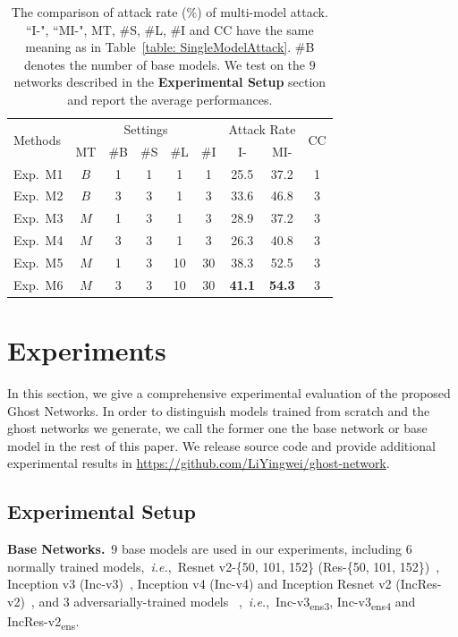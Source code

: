 \documentclass[letterpaper]{article} %
\def\ie{\emph{i.e.}}
\begin{document}
\begin{table}[tb]
\vspace{1ex}
\centering
\small
\begin{tabular}{|l|ccccc|cc|c|}
\hline
\multirow{2}{*}{Methods} & \multicolumn{5}{c|}{Settings} & \multicolumn{2}{c|}{Attack Rate} & \multirow{2}{*}{CC}  \\
\cline{2-8}
   & MT & \#B & \#S & \#L & \#I & I- & MI- &\\ 
\hline
\hline
Exp.~M1 & $B$ & 1 & 1 & 1 & 1  & 25.5 & 37.2 & 1 \\ 
Exp.~M2 & $B$ & 3 & 3 & 1 & 3  & 33.6 & 46.8 & 3 \\ 
Exp.~M3 & $M$ & 1 & 3 & 1 & 3  & 28.9 & 37.2 & 3 \\ 
Exp.~M4 & $M$ & 3 & 3 & 1 & 3  & 26.3 & 40.8 & 3 \\ 
Exp.~M5 & $M$ & 1 & 3 & 10& 30 & 38.3 & 52.5 & 3 \\ 
Exp.~M6 & $M$ & 3 & 3 & 10& 30 & \textbf{41.1} & \textbf{54.3} & 3 \\ 
\hline
\end{tabular}
\caption{The comparison of attack rate ($\%$) of multi-model attack. ``I-", ``MI-", MT, \#S, \#L, \#I and CC have the same meaning as in Table~\ref{table: SingleModelAttack}. \#B denotes the number of base models. We test on the $9$ networks described in the \textbf{Experimental Setup} section and report the average performances.}
\label{table: MultiModelAttack}
\end{table}

\section{Experiments}
In this section, we give a comprehensive experimental evaluation of the proposed Ghost Networks. In order to distinguish models trained from scratch and the ghost networks we generate, we call the former one the base network or base model in the rest of this paper. We release source code and provide additional experimental results in \url{https://github.com/LiYingwei/ghost-network}.

\subsection{Experimental Setup} \label{sec:setupExp}
\vspace{1ex}\noindent\textbf{Base Networks.}~$9$ base models are used in our experiments,  including $6$ normally trained models,~\ie,~Resnet v2-\{50, 101, 152\} (Res-\{50, 101, 152\})~\cite{he2016identity}, Inception v3 (Inc-v3)~\cite{szegedy2017inception}, Inception v4 (Inc-v4) and Inception Resnet v2 (IncRes-v2)~\cite{szegedy2016rethinking}, and $3$ adversarially-trained models~\cite{tramer2017ensemble}
,~\ie,~Inc-v3\textsubscript{ens3}, Inc-v3\textsubscript{ens4} and IncRes-v2\textsubscript{ens}.
\end{document}
